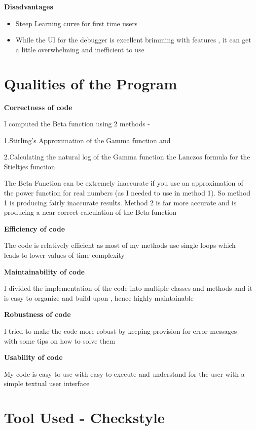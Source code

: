 \documentclass[12pt,letterpaper]{article}
\begin{document}
\textbf{Disadvantages}

\begin{itemize}
\item{Steep Learning curve for first time users}
\item{While the UI for the debugger is excellent brimming with features , it can get a little overwhelming and inefficient to use}
\end{itemize}



\section*{Qualities of the Program}

\textbf{Correctness of code}

I computed the Beta function using 2 methods - 

1.Stirling's Approximation of the Gamma function and 

2.Calculating the natural log of the Gamma function the Lanczos formula for the Stieltjes function

The Beta Function can be extremely inaccurate if you use an approximation of the power function for real numbers (as I needed to use in method 1). So method 1 is producing fairly inaccurate results.
Method 2 is far more accurate and is producing a near correct calculation of the Beta function

\textbf{Efficiency of code}

The code is relatively efficient as most of my methods use single loops which leads to lower values of time complexity

\textbf{Maintainability of code}

I divided the implementation of the code into multiple classes and methods and it is easy to organize and build upon , hence highly maintainable

\textbf{Robustness of code}

I tried to make the code more robust by keeping provision for error messages with some tips on how to solve them

\textbf{Usability of code}

My code is easy to use with easy to execute and understand for the user with a simple textual user interface


\section*{Tool Used - Checkstyle}
\end{document}
